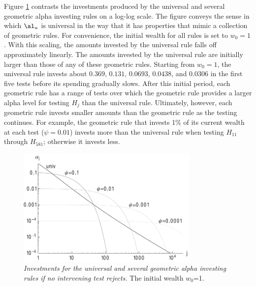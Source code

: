 \documentclass[12pt]{article}
\begin{document}
 
 Figure \ref{fig:rules} contrasts the investments produced by the universal and
 several geometric alpha investing rules on a log-log scale.  The figure conveys
 the sense in which $\al_u$ is universal in the way that it has properties that
 mimic a collection of geometric rules.  For convenience, the initial wealth for
 all rules is set to $w_0 = 1$.  With this scaling, the amounts invested by the
 universal rule falls off approximately linearly.  The amounts invested by the
 universal rule are initially larger than those of any of these geometric rules.
  Starting from $w_0=1$, the universal rule invests about $0.369$, $0.131$,
 $0.0693$, $0.0438$, and $0.0306$ in the first five tests before its spending
 gradually slows.  After this initial period, each geometric rule has a range of
 tests over which the geometric rule provides a larger alpha level for testing
 $H_j$ than the universal rule.  Ultimately, however, each geometric rule
 invests smaller amounts than the geometric rule as the testing continues.  For
 example, the geometric rule that invests 1\% of its current wealth at each test
 ($\psi=0.01$) invests more than the universal rule when testing $H_{11}$
 through $H_{581}$; otherwise it invests less. 


 \begin{figure}
 \caption{ \label{fig:rules} { \sl Investments for the universal and several
 geometric alpha investing rules if no intervening test rejects. } The initial
 wealth $w_0$=1. }

 \centerline{
 \vspace{0.1in}
 \includegraphics[width=3.5in]{figures/rules} }
 \vspace{0.2in}
 \end{figure}
\end{document}
